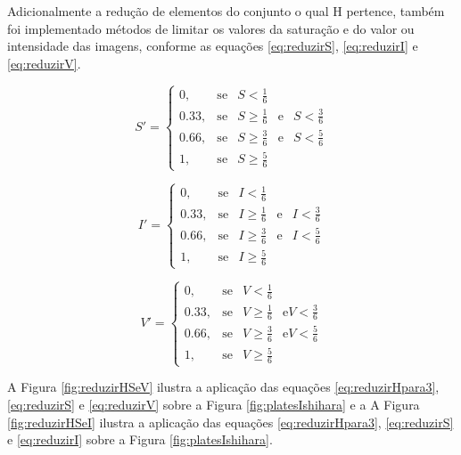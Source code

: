 \documentclass[	12pt, Times, openright, twoside, a4paper, english, brazil]{abntex2}
\begin{document}
Adicionalmente a redução de elementos do conjunto o qual H pertence, também foi implementado métodos de limitar os valores da saturação e do valor ou intensidade das imagens, conforme as equações \ref{eq:reduzirS}, \ref{eq:reduzirI} e \ref{eq:reduzirV}.

\begin{equation}
\label{eq:reduzirS}
S'=\left\{
\begin{array}{rclcl}
       0,   &\mbox{se}  & S <    \frac{1}{6}                                    \\
    0.33,   &\mbox{se}  & S \geq \frac{1}{6} & \mbox{e} & S < \frac{3}{6}       \\
    0.66,   &\mbox{se}  & S \geq \frac{3}{6} & \mbox{e} & S < \frac{5}{6}       \\
       1,   &\mbox{se}  & S \geq \frac{5}{6}
\end{array}\right.
\end{equation}

\begin{equation}
\label{eq:reduzirI}
I'=\left\{
\begin{array}{rclcl}
       0,   &\mbox{se}  & I <    \frac{1}{6}                        \\
    0.33,   &\mbox{se}  & I \geq \frac{1}{6} & \mbox{e} & I < \frac{3}{6}      \\
    0.66,   &\mbox{se}  & I \geq \frac{3}{6} & \mbox{e} & I < \frac{5}{6}      \\
       1,   &\mbox{se}  & I \geq \frac{5}{6}
\end{array}\right.
\end{equation}

\begin{equation}
\label{eq:reduzirV}
V'=\left\{
\begin{array}{rclcl}
       0,   &\mbox{se}  & V <    \frac{1}{6}                                 \\
    0.33,   &\mbox{se}  & V \geq \frac{1}{6} & \mbox{e} V < \frac{3}{6}      \\
    0.66,   &\mbox{se}  & V \geq \frac{3}{6} & \mbox{e} V < \frac{5}{6}      \\
       1,   &\mbox{se}  & V \geq \frac{5}{6}
\end{array}\right.
\end{equation}

A Figura \ref{fig:reduzirHSeV} ilustra a aplicação das equações \ref{eq:reduzirHpara3}, \ref{eq:reduzirS} e \ref{eq:reduzirV} sobre a Figura \ref{fig:platesIshihara} e a A Figura \ref{fig:reduzirHSeI} ilustra a aplicação das equações \ref{eq:reduzirHpara3}, \ref{eq:reduzirS} e \ref{eq:reduzirI} sobre a Figura \ref{fig:platesIshihara}.
\end{document}

